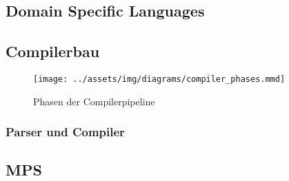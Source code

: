 \lipsum[5]

\subsection{Domain Specific Languages}\label{subsec:domain-specific-languages}
\lipsum[5]

\subsection{Compilerbau}\label{subsec:compilerbau}
\begin{wrapfigure}{rH}{0.5\textwidth}
    \begin{center}
        \texttt{[image: ../assets/img/diagrams/compiler\_phases.mmd]}
    \end{center}
    \caption{Phasen der Compilerpipeline~\autocite{aho-2006}}
    \label{fig:cpmpiler-phases}
\end{wrapfigure}
\lipsum[5]

\subsubsection{Parser und Compiler}
\lipsum[5]

\subsection{\acl{MPS}}\label{subsec:meta-programming-system}
\lipsum[5]
